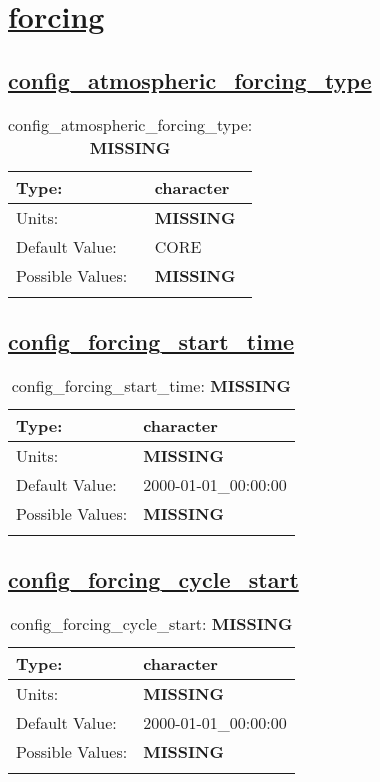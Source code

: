 \section[forcing]{\hyperref[sec:nm_tab_forcing]{forcing}}
\label{sec:nm_sec_forcing}
\subsection[config\_atmospheric\_forcing\_type]{\hyperref[sec:nm_tab_forcing]{config\_atmospheric\_forcing\_type}}
\label{subsec:nm_sec_config_atmospheric_forcing_type}
\begin{center}
\begin{longtable}{| p{2.0in} || p{4.0in} |}
    \hline
    Type: & character \\
    \hline
    Units: & {\bf \color{red} MISSING} \\
    \hline
    Default Value: & CORE \\
    \hline
    Possible Values: & {\bf \color{red} MISSING} \\
    \hline
    \caption{config\_atmospheric\_forcing\_type: {\bf \color{red} MISSING}}
\end{longtable}
\end{center}
\subsection[config\_forcing\_start\_time]{\hyperref[sec:nm_tab_forcing]{config\_forcing\_start\_time}}
\label{subsec:nm_sec_config_forcing_start_time}
\begin{center}
\begin{longtable}{| p{2.0in} || p{4.0in} |}
    \hline
    Type: & character \\
    \hline
    Units: & {\bf \color{red} MISSING} \\
    \hline
    Default Value: & 2000-01-01\_00:00:00 \\
    \hline
    Possible Values: & {\bf \color{red} MISSING} \\
    \hline
    \caption{config\_forcing\_start\_time: {\bf \color{red} MISSING}}
\end{longtable}
\end{center}
\subsection[config\_forcing\_cycle\_start]{\hyperref[sec:nm_tab_forcing]{config\_forcing\_cycle\_start}}
\label{subsec:nm_sec_config_forcing_cycle_start}
\begin{center}
\begin{longtable}{| p{2.0in} || p{4.0in} |}
    \hline
    Type: & character \\
    \hline
    Units: & {\bf \color{red} MISSING} \\
    \hline
    Default Value: & 2000-01-01\_00:00:00 \\
    \hline
    Possible Values: & {\bf \color{red} MISSING} \\
    \hline
    \caption{config\_forcing\_cycle\_start: {\bf \color{red} MISSING}}
\end{longtable}
\end{center}
